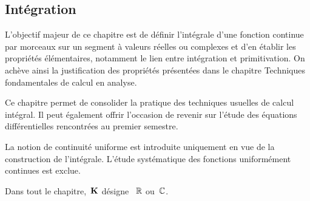 \subsection{Intégration}
\begin{itshape}
L'objectif majeur de ce chapitre est de définir l'intégrale d'une fonction continue par morceaux sur un segment à valeurs réelles ou complexes et d'en établir les propriétés élémentaires, notamment le lien entre intégration et primitivation. On achève ainsi la justification des propriétés présentées dans le chapitre \og Techniques fondamentales de calcul en analyse\fg.

Ce chapitre permet de consolider la pratique des techniques usuelles de calcul intégral. Il peut également offrir l'occasion de revenir sur l'étude des équations différentielles rencontrées au premier semestre.



La notion de continuité uniforme est introduite uniquement en vue de la construction de l'intégrale. L'étude systématique des fonctions uniformément continues est exclue.

Dans tout le chapitre, \,$\mathbf{K}$ désigne \, $\mathbb{R}$ ou \,$\mathbb{C}$.
\end{itshape}

\begin{parcolumns}[rulebetween,distance=\parcoldist]{2}
  \colchunk{}
  \colplacechunks

  \colplacechunks
\end{parcolumns}


\begin{parcolumns}[rulebetween,distance=\parcoldist]{2}
  \colchunk{}
  \colplacechunks

  \colchunk{}
  \colplacechunks

  \colplacechunks
\end{parcolumns}

